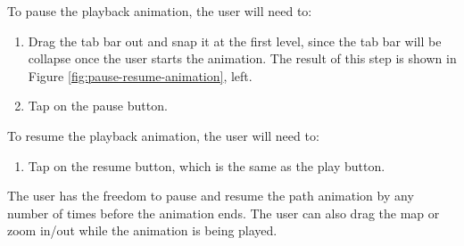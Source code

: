 \documentclass[12pt,a4paper]{article}
\begin{document}
                To pause the playback animation, the user will need to:
                \begin{enumerate}
                    \item Drag the tab bar out and snap it at the first level, since the tab bar will be collapse once the user starts the animation. The result of this step is shown in Figure \ref{fig:pause-resume-animation}, left.
                    \item Tap on the pause button.
                \end{enumerate}
                
                To resume the playback animation, the user will need to:
                \begin{enumerate}
                    \item Tap on the resume button, which is the same as the play button.
                \end{enumerate}
                
                The user has the freedom to pause and resume the path animation by any number of times before the animation ends. The user can also drag the map or zoom in/out while the animation is being played.
                
\end{document}
